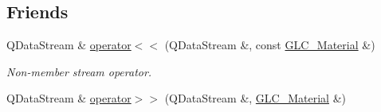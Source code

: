 \subsection*{Friends}
\begin{DoxyCompactItemize}
\item 
Q\-Data\-Stream \& \hyperlink{class_g_l_c___material_aad55ab8f9fc6b91d2a80b31865397afc}{operator$<$$<$} (Q\-Data\-Stream \&, const \hyperlink{class_g_l_c___material}{G\-L\-C\-\_\-\-Material} \&)
\begin{DoxyCompactList}\small\item\em Non-\/member stream operator. \end{DoxyCompactList}\item 
Q\-Data\-Stream \& \hyperlink{class_g_l_c___material_a22df39b5be309c55391b21093a439828}{operator$>$$>$} (Q\-Data\-Stream \&, \hyperlink{class_g_l_c___material}{G\-L\-C\-\_\-\-Material} \&)
\end{DoxyCompactItemize}
